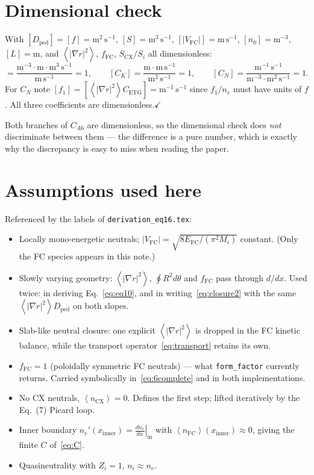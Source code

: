 \documentclass[11pt]{article}
\renewcommand{\ne}{n_{e}}  %
\newcommand{\nfc}{n_{\mathrm{FC}}}
\newcommand{\ncx}{n_{\mathrm{CX}}}
\newcommand{\Vfc}{\lvert V_{\mathrm{FC}}\rvert}
\newcommand{\Si}{S_{i}}
\newcommand{\Scx}{S_{\mathrm{CX}}}
\newcommand{\Dped}{D_{\mathrm{ped}}}
\newcommand{\fFC}{f_{\mathrm{FC}}}
\newcommand{\fsa}[1]{\left\langle #1 \right\rangle}
\newcommand{\gradrsq}{\fsa{|\nabla r|^{2}}}
\newcommand{\dnein}{\left.\frac{d\ne}{dx}\right|_{\mathrm{in}}}
\newcommand{\xin}{x_{\mathrm{inner}}}
\begin{document}
\section{Dimensional check}
\label{sec:dimcheck}

With $[\Dped]=[f]=\mathrm{m^{2}\,s^{-1}}$, $[S]=\mathrm{m^{3}\,s^{-1}}$,
$[\Vfc]=\mathrm{m\,s^{-1}}$, $[n_{0}]=\mathrm{m^{-3}}$, $[L]=\mathrm{m}$,
and $\gradrsq$, $\fFC$, $\Scx/\Si$ all dimensionless:
\begin{equation}
  [C_{A6}] = \frac{\mathrm{m^{-3}}\cdot\mathrm{m}\cdot\mathrm{m^{3}\,s^{-1}}}
                  {\mathrm{m\,s^{-1}}} = 1,
  \qquad
  [C_{K}] = \frac{\mathrm{m}\cdot\mathrm{m\,s^{-1}}}{\mathrm{m^{2}\,s^{-1}}} = 1,
  \qquad
  [C_{N}] = \frac{\mathrm{m^{-1}\,s^{-1}}}
                 {\mathrm{m^{-3}}\cdot\mathrm{m^{2}\,s^{-1}}} = 1 .
\end{equation}
For $C_{N}$ note $[f_{1}] = [\gradrsq C_{\mathrm{ETG}}] =
\mathrm{m^{-1}\,s^{-1}}$ since $f_{1}/\ne$ must have units of $f$.  All
three coefficients are dimensionless.\hfill$\checkmark$

Both branches of $C_{A6}$ are dimensionless, so the dimensional check does
\emph{not} discriminate between them --- the difference is a pure number,
which is exactly why the discrepancy is easy to miss when reading the
paper.

\section{Assumptions used here}
\label{sec:assumptions}

Referenced by the labels of \texttt{derivation\_eq16.tex}:

\begin{itemize}
  \item[\textbf{A1}] Locally mono-energetic neutrals;
        $\Vfc=\sqrt{8E_{\mathrm{FC}}/(\pi^{2}M_{i})}$ constant.
        (Only the FC species appears in this note.)
  \item[\textbf{A2}] Slowly varying geometry: $\gradrsq$, $\oint R^{2}d\theta$
        and $\fFC$ pass through $d/dx$.  Used twice: in deriving
        Eq.~\eqref{eq:eq10}, and in writing~\eqref{eq:closure2} with the
        same $\gradrsq\Dped$ on both slopes.
  \item[\textbf{A3}] Slab-like neutral closure: one explicit $\gradrsq$ is
        dropped in the FC kinetic balance, while the transport
        operator~\eqref{eq:transport} retains its own.
  \item[\textbf{A4}] $\fFC=1$ (poloidally symmetric FC neutrals) --- what
        \texttt{form\_factor} currently returns.  Carried symbolically
        in~\eqref{eq:6complete} and in both implementations.
  \item[\textbf{A6}] No CX neutrals, $\fsa{\ncx}=0$.  Defines the first
        step; lifted iteratively by the Eq.~(7) Picard loop.
  \item[\textbf{A7}] Inner boundary $\ne'(\xin)=\dnein$ with
        $\fsa{\nfc}(\xin)\approx0$, giving the finite $C$ of~\eqref{eq:C}.
  \item[\textbf{A8}] Quasineutrality with $Z_{i}=1$, $n_{i}\approx\ne$.
\end{itemize}
\end{document}
